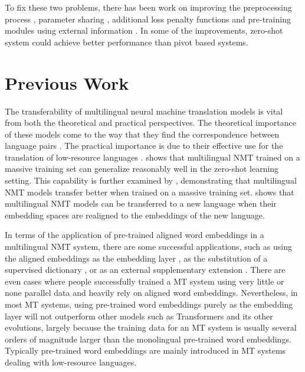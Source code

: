 \documentclass[thesis,fonts=libertine]{cluu}
\begin{document}
To fix these two problems, there has been work on improving the preprocessing process \parencite{Lakew:2018aa}, parameter sharing \parencite{Firat:2016aa, Blackwood:2018aa}, additional loss penalty functions \parencite{Arivazhagan:2019aa} and pre-training modules using external information \parencite{Baziotis:2020aa}. In some of the improvements, zero-shot system could achieve better performance than pivot based systems.

\section{Previous Work}
\label{sec:previous_work}

The transferability of multilingual neural machine translation models is vital from both the theoretical and practical perspectives. The theoretical importance of these models come to the way that they find the correspondence between language pairs \parencite{Johnson:2016aa,lu-etal-2018-neural}. The practical importance is due to their effective use for the translation of low-resource languages \parencite{Zoph:2016aa,Nguyen:2017aa}. \textcite{Johnson:2016aa} shows that multilingual NMT trained on a massive training set can generalize reasonably well in the zero-shot learning setting. This capability is further examined by \textcite{aharoni-etal-2019-massively}, demonstrating that multilingual NMT models transfer better when trained on a massive training set. \textcite{Kim:2019aa} shows that multilingual NMT models can be transferred to a new language when their embedding spaces are realigned to the embeddings of the new language.

In terms of the application of pre-trained aligned word embeddings in a multilingual NMT system, there are some successful applications, such as using the aligned embeddings as the embedding layer \parencite{neishi-etal-2017-bag, Artetxe:2017aa}, as the substitution of a supervised dictionary \parencite{Conneau:2017aa}, or as an external supplementary extension \parencite{inproceedings}. There are even cases where people successfully trained a MT system using very little or none parallel data \parencite{Conneau:2017aa} and heavily rely on aligned word embeddings. Nevertheless, in most MT systems, using pre-trained word embeddings purely as the embedding layer will not outperform other models such as Transformers \parencite{Vaswani:2017aa} and its other evolutions, largely because the training data for an MT system is usually several orders of magnitude larger than the monolingual pre-trained word embeddings. Typically pre-trained word embeddings are mainly introduced in MT systems dealing with low-resource languages.
\end{document}

